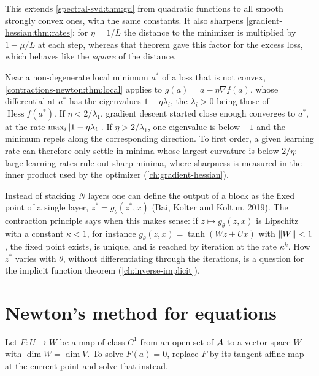 \begin{notechapter}
This extends \cref{spectral-svd:thm:gd} from quadratic functions to all
smooth strongly convex ones, with the same constants. It also sharpens
\cref{gradient-hessian:thm:rates}: for $\eta = 1/L$ the distance to the
minimizer is multiplied by $1 - \mu/L$ at each step, whereas that theorem
gave this factor for the excess loss, which behaves like the
\emph{square} of the distance.

\begin{mlthread}
Near a non-degenerate local minimum $a^*$ of a loss that is not convex,
\cref{contractions-newton:thm:local} applies to
$g(a) = a - \eta\nabla f(a)$, whose differential at $a^*$ has the
eigenvalues $1 - \eta\lambda_i$, the $\lambda_i > 0$ being those of
$\operatorname{Hess}f(a^*)$. If $\eta < 2/\lambda_1$, gradient descent
started close enough converges to $a^*$, at the rate
$\max_i\left|1 - \eta\lambda_i\right|$. If $\eta > 2/\lambda_1$, one eigenvalue
is below $-1$ and the minimum repels along the corresponding direction.
To first order, a given learning rate can therefore only settle in minima
whose largest curvature is below $2/\eta$: large learning rates rule out
sharp minima, where sharpness is measured in the inner product used by
the optimizer (\cref{ch:gradient-hessian}).
\end{mlthread}

\begin{mlthread}
Instead of stacking $N$ layers one can define the output of a block as
the fixed point of a single layer, $z^* = g_\theta(z^*, x)$ (Bai, Kolter
and Koltun, 2019). The contraction principle says when this makes sense:
if $z\mapsto g_\theta(z, x)$ is Lipschitz with a constant $\kappa < 1$,
for instance $g_\theta(z, x) = \tanh(Wz + Ux)$ with $\left\|W\right\| < 1$, the
fixed point exists, is unique, and is reached by iteration at the rate
$\kappa^k$. How $z^*$ varies with $\theta$, without differentiating
through the iterations, is a question for the implicit function theorem
(\cref{ch:inverse-implicit}).
\end{mlthread}

\section{Newton's method for equations}\label{contractions-newton:sec:newton}

Let $F:U\to W$ be a map of class $C^1$ from an open set of $\mathcal{A}$ to a
vector space $W$ with $\dim W = \dim V$. To solve $F(a) = 0$, replace $F$
by its tangent affine map at the current point and solve that instead.


\end{notechapter}

